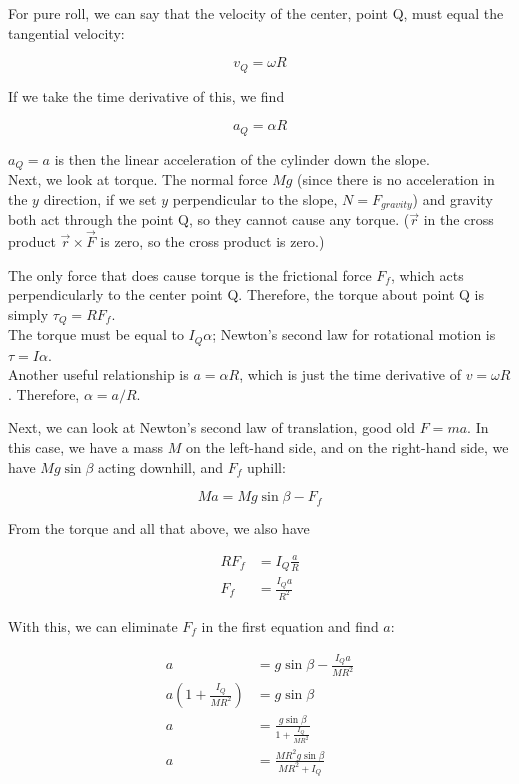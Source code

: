 For pure roll, we can say that the velocity of the center, point Q, must equal the tangential velocity:

\begin{equation}
v_Q = \omega R
\end{equation}

If we take the time derivative of this, we find

\begin{equation}
a_Q = \alpha R
\end{equation}

$a_Q = a$ is then the linear acceleration of the cylinder down the slope.\\
Next, we look at torque. The normal force $M g$ (since there is no acceleration in the $y$ direction, if we set $y$ perpendicular to the slope, $N = F_{gravity}$) and gravity both act through the point Q, so they cannot cause any torque. ($\vec{r}$ in the cross product $\vec{r} \times \vec{F}$ is zero, so the cross product is zero.)

The only force that does cause torque is the frictional force $F_f$, which acts perpendicularly to the center point Q. Therefore, the torque about point Q is simply $\tau_Q = R F_f$.\\
The torque must be equal to $I_Q \alpha$; Newton's second law for rotational motion is $\tau = I \alpha$.\\
Another useful relationship is $a = \alpha R$, which is just the time derivative of $v = \omega R$. Therefore, $\alpha = a/R$.

Next, we can look at Newton's second law of translation, good old $F = m a$. In this case, we have a mass $M$ on the left-hand side, and on the right-hand side, we have $M g \sin \beta$ acting downhill, and $F_f$ uphill:

\begin{equation}
M a = M g \sin \beta - F_f
\end{equation}

From the torque and all that above, we also have

\begin{align}
R F_f &= I_Q \frac{a}{R}\\
F_f &= \frac{I_Q a}{R^2}
\end{align}

With this, we can eliminate $F_f$ in the first equation and find $a$:

\begin{align}
a &= g \sin \beta - \frac{I_Q a}{M R^2}\\
a \left(1 + \frac{I_Q}{M R^2}\right) &= g \sin \beta\\
a &= \frac{g \sin \beta}{1 + \frac{I_Q}{M R^2}}\\
a &= \frac{M R^2 g \sin \beta}{M R^2 + I_Q}
\end{align}


